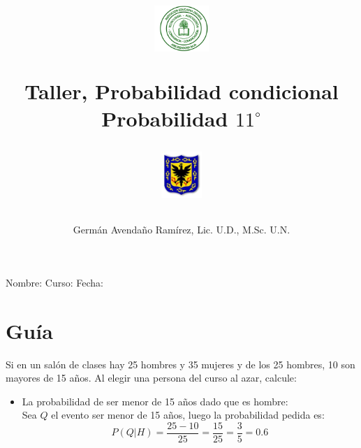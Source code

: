 \documentclass[10pt,twoside]{article}
\author{Germ\'an Avenda\~no Ram\'irez, Lic. U.D., M.Sc. U.N.}
\title{\begin{minipage}{.2\textwidth}
\includegraphics[height=1.75cm]{Images/logo-colegio.png}\end{minipage}
\begin{minipage}{.55\textwidth}
\begin{center}
Taller, Probabilidad condicional  \\
Probabilidad $11^{\circ}$
\end{center}
\end{minipage}\hfill
\begin{minipage}{.2\textwidth}
\includegraphics[height=1.75cm]{Images/logo-sed.png} 
\end{minipage}}
\date{}
\begin{document}
\maketitle
Nombre: \hrulefill Curso: \underline{\hspace*{44pt}} Fecha: \underline{\hspace*{2.5cm}}
\section*{Gu\'{i}a}
Si en un sal\'{o}n de clases  hay 25 hombres y 35 mujeres y de los 25 hombres, 10 son mayores de 15 años. Al elegir una persona del curso al azar, calcule:
\begin{itemize}
\item La probabilidad de ser menor de 15 años dado que es hombre:\\
Sea $Q$ el evento ser menor de 15 años, luego la probabilidad pedida es:
\[P(Q|H)=\dfrac{25-10}{25}=\dfrac{15}{25}=\dfrac{3}{5}=0.6\]
\end{itemize}
\end{document}
